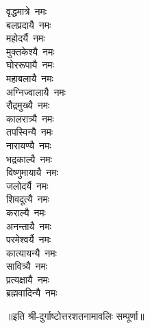\begin{multicols}{2}
\begin{flushleft}
वृद्धमात्रे~नमः\\
बलप्रदायै~नमः\\
महोदर्यै~नमः\\
मुक्तकेश्यै~नमः\hfill{}\\
घोररूपायै~नमः\\
महाबलायै~नमः\\
अग्निज्वालायै~नमः\\
रौद्रमुख्यै~नमः\\
कालरात्र्यै~नमः\\
तपस्विन्यै~नमः\\
नारायण्यै~नमः\\
भद्रकाल्यै~नमः\\
विष्णुमायायै~नमः\\
जलोदर्यै~नमः\hfill{}\\
शिवदूत्यै~नमः\\
कराल्यै~नमः\\
अनन्तायै~नमः\\
परमेश्वर्यै~नमः\\
कात्यायन्यै~नमः\\
सावित्र्यै~नमः\\
प्रत्यक्षायै~नमः\\
ब्रह्मवादिन्यै~नमः\hfill{}\\
\end{flushleft}
\end{multicols}
॥इति श्री-दुर्गाष्टोत्तरशतनामावलिः सम्पूर्णा॥
